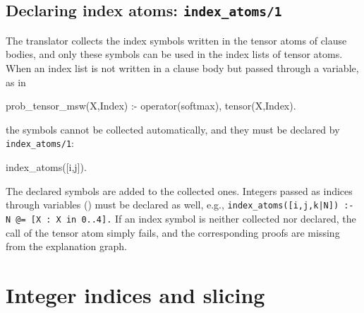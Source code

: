 \documentclass[a4paper]{report}
\begin{document}
\subsection*{Declaring index atoms: {\tt index\_atoms/1}}
The translator collects the index symbols written in the tensor atoms of
clause bodies, and only these symbols can be used in the index lists of
tensor atoms.  When an index list is not written in a clause body but
passed through a variable, as in
\begin{prologcode}
prob_tensor_msw(X,Index) :- operator(softmax), tensor(X,Index).
\end{prologcode}
the symbols cannot be collected automatically, and they must be declared by {\tt index\_atoms/1}:
\begin{prologcode}
index_atoms([i,j]).
\end{prologcode}
The declared symbols are added to the collected ones.  Integers passed
as indices through variables () must be declared
as well, e.g., {\tt index\_atoms([i,j,k|N]) :- N @= [X : X in 0..4].}
If an index symbol is neither collected nor declared, the call of the
tensor atom simply fails, and the corresponding proofs are missing from the
explanation graph.

\section{Integer indices and slicing}
\label{sec:slicing}
\end{document}
